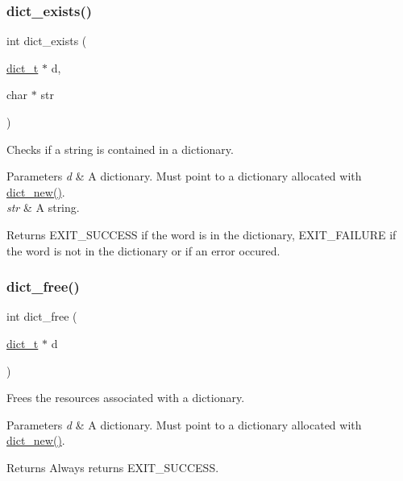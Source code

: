\subsubsection{\texorpdfstring{dict\+\_\+exists()}{dict\_exists()}}
{\footnotesize\ttfamily int dict\+\_\+exists (\begin{DoxyParamCaption}\item[{\mbox{\hyperlink{structdict__t}{dict\+\_\+t}} $\ast$}]{d,  }\item[{char $\ast$}]{str }\end{DoxyParamCaption})}



Checks if a string is contained in a dictionary. 


\begin{DoxyParams}{Parameters}
{\em d} & A dictionary. Must point to a dictionary allocated with \mbox{\hyperlink{structdict__t_a0074913fdba65680670bf93153225e2f}{dict\+\_\+new()}}. \\
\hline
{\em str} & A string. \\
\hline
\end{DoxyParams}
\begin{DoxyReturn}{Returns}
E\+X\+I\+T\+\_\+\+S\+U\+C\+C\+E\+SS if the word is in the dictionary, E\+X\+I\+T\+\_\+\+F\+A\+I\+L\+U\+RE if the word is not in the dictionary or if an error occured. 
\end{DoxyReturn}
\mbox{\label{structdict__t_a51ee6c067decce8dbc182f95f7b33e91}} 
\subsubsection{\texorpdfstring{dict\+\_\+free()}{dict\_free()}}
{\footnotesize\ttfamily int dict\+\_\+free (\begin{DoxyParamCaption}\item[{\mbox{\hyperlink{structdict__t}{dict\+\_\+t}} $\ast$}]{d }\end{DoxyParamCaption})}



Frees the resources associated with a dictionary. 


\begin{DoxyParams}{Parameters}
{\em d} & A dictionary. Must point to a dictionary allocated with \mbox{\hyperlink{structdict__t_a0074913fdba65680670bf93153225e2f}{dict\+\_\+new()}}. \\
\hline
\end{DoxyParams}
\begin{DoxyReturn}{Returns}
Always returns E\+X\+I\+T\+\_\+\+S\+U\+C\+C\+E\+SS. 
\end{DoxyReturn}
\mbox{\label{structdict__t_a81c807e5c6b67b7b482dcac658c0fc57}} 
